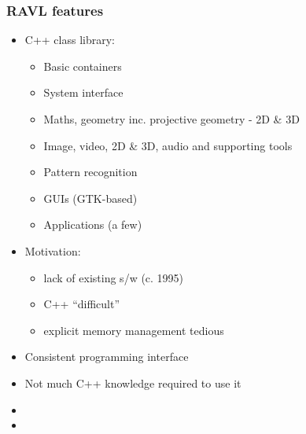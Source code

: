 \documentclass[landscape]{beamer}
\begin{document}
\begin{frame}  \frametitle{RAVL features}
  
  \begin{itemize}
    \pause\item  C++ class library:
    \begin{itemize}
    \item Basic containers
    \item System interface
    \item Maths, geometry inc. projective geometry - 2D \& 3D
    \item Image, video, 2D \& 3D, audio and supporting tools
    \item Pattern recognition
    \item GUIs (GTK-based)
    \item Applications (a few)
    \end{itemize} 
    
    \pause\item  Motivation: 
    \begin{itemize}
    \item lack of existing s/w (c. 1995)
    \item C++ ``difficult''
    \item explicit memory management tedious
    \end{itemize}
  
    \pause\item  Consistent programming interface 
    
    \pause\item  Not much C++ knowledge required to use it

    \pause\item  {}

    \pause\item  {}

  \end{itemize}
  
\end{frame}
\end{document}
